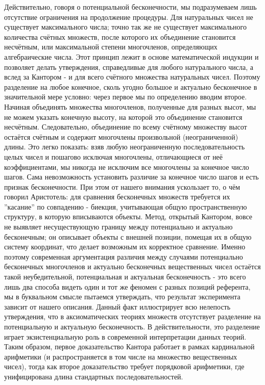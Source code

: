 \documentclass[12pt]{article}
\begin{document}
Действительно, говоря о потенциальной бесконечности, мы подразумеваем лишь отсутствие ограничения на продолжение процедуры. Для натуральных чисел не существует максимального числа; точно так же не существует максимального количества счётных множеств, после которого их объединение становится несчётным, или максимальной степени многочленов, определяющих алгебраические числа. Этот принцип лежит в основе математической индукции и позволяет делать утверждения, справедливые для любого натурального числа, а вслед за Кантором - и для всего счётного множества натуральных чисел. Поэтому разделение на любое конечное, сколь угодно большое и актуально бесконечное в значительной мере условно: через первое мы по определению вводим второе. Начиная объединять множества многочленов, полученные для разных высот, мы не можем указать конечную высоту, на которой это объединение становится несчётным. Следовательно, объединение по всему счётному множеству высот остаётся счётным и содержит многочлены произвольной (неограниченной) длины. Это легко показать: взяв любую неограниченную последовательность целых чисел и пошагово исключая многочлены, отличающиеся от неё коэффициентами, мы никогда не исключим все многочлены за конечное число шагов. Сама невозможность установить различие за конечное число шагов и есть признак бесконечности. При этом от нашего внимания ускользает то, о чём говорил Аристотель: для сравнения бесконечных множеств требуется их ''касание'' по совпадению - биекция, учитывающая общую пространственную структуру, в которую вписываются объекты. Метод, открытый Кантором, вовсе не выявляет несуществующую границу между потенциально и актуально бесконечным; он описывает объекты с внешней позиции, помещая их в общую систему координат, что делает возможным их корректное сравнение. Именно поэтому современная аргументация различия между случаями потенциально бесконечных многочленов и актуально бесконечных вещественных чисел остаётся такой неубедительной, потенциальная и актуальная бесконечность - это всего лишь два способа видеть один и тот же феномен с разных позиций референта, мы в буквальном смысле пытаемся утверждать, что результат эксперимента зависит от нашего описания. Данный факт иллюстрирует всю нелепость утверждения, что в аксиоматических теориях множеств отсутствует разделение на потенциальную и актуальную бесконечность. В действительности, это разделение играет экзистенциальную роль в современной интерпретации данных теорий. Таким образом, первое доказательство Кантора работает в рамках кардинальной арифметики (и распространяется в том числе на множество вещественных чисел), тогда как второе доказательство требует порядковой арифметики, где унифицирована длина стандартных последовательностей.
\end{document}
